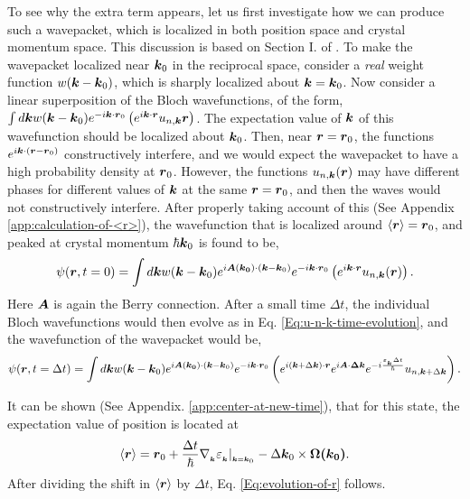 \documentclass{report}
\renewcommand\vec[1]{\ensuremath\boldsymbol{#1}} %
\begin{document}
To see why the extra term appears, let us first investigate how we can produce such a wavepacket, which is localized in both position space and crystal momentum space. This discussion is based on Section I. of \cite{ralph2020berry}. To make the wavepacket localized near $\vec{k}_0$ in the reciprocal space, consider a \textit{real} weight function $w(\vec{k} - \vec{k}_0)$, which is sharply localized about $\vec{k} = \vec{k}_0$. Now consider a linear superposition of the Bloch wavefunctions, of the form, $\int d\vec{k} w(\vec{k} - \vec{k}_0) e^{-i \vec{k} \cdot \vec{r}_0 } \left(e^{i \vec{k} \cdot\vec{r}} u_{n,\vec{k}}\vec{r}\right)$. The expectation value of $\vec{k}$ of this wavefunction should be localized about $\vec{k}_0$. Then, near $\vec{r} = \vec{r}_0$, the functions $e^{i \vec{k} \cdot (\vec{r} -\vec{r}_0 )}$ constructively interfere, and we would expect the wavepacket to have a high probability density at $\vec{r}_0$. However, the functions $u_{n,\vec{k}}(\vec{r})$ may have different phases for different values of $\vec{k}$ at the same $\vec{r} = \vec{r}_0$, and then the waves would not constructively interfere.
After properly taking account of this (See Appendix \ref{app:calculation-of-<r>}), the wavefunction that is localized around $\expval{\vec{r}} = \vec{r}_0$, and peaked at crystal momentum $\hbar \vec{k}_0$ is found to be,
$$\psi(\vec{r}, t=0) = \int d\vec{k} w(\vec{k} - \vec{k}_0) e^{i \vec{A}(\vec{k_0})\cdot (\vec{k} - \vec{k}_0)} e^{-i \vec{k} \cdot \vec{r}_0 } \left(e^{i \vec{k} \cdot\vec{r}} u_{n,\vec{k}}(\vec{r})\right).$$
Here $\vec{A}$ is again the Berry connection. After a small time $\Delta t$, the individual Bloch wavefunctions would then evolve as in Eq. \eqref{Eq:u-n-k-time-evolution}, and the wavefunction of the wavepacket would be,
$$\psi(\vec{r}, t=\Delta t) = \int d\vec{k} w(\vec{k} - \vec{k}_0) e^{i \vec{A}(\vec{k_0})\cdot (\vec{k} - \vec{k}_0)} e^{-i \vec{k} \cdot \vec{r}_0 } \left(e^{i (\vec{k} + \Delta\vec{k})\cdot\vec{r}} e^{i \vec{A}\cdot \vec{\Delta{k}}} e^{-i \frac{\varepsilon_{_{\vec{k}}} \Delta t}{\hbar}} u_{n, \vec{k}+\Delta \vec{k}} \right).$$

It can be shown (See Appendix. \ref{app:center-at-new-time}), that for this state, the expectation value of position is located at
$$\langle \vec{r} \rangle = \vec{r}_0 +  \frac{\Delta t}{\hbar} \nabla{_{_{\vec{k}}}} \varepsilon_{_{\vec{k}}}|_{_{\vec{k} = \vec{k}_0}} - \Delta \vec{k}_0 \times \vec{\Omega(\vec{k}_0)}.$$
After dividing the shift in $\langle{\vec{r}}\rangle$ by $\Delta t$, Eq. \eqref{Eq:evolution-of-r} follows.
\end{document}
